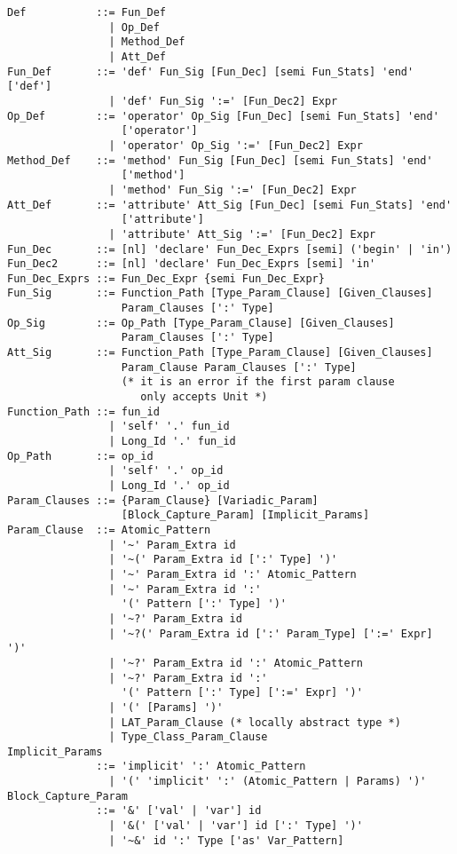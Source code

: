 \begin{lstlisting}
Def           ::= Fun_Def
                | Op_Def
                | Method_Def
                | Att_Def
Fun_Def       ::= 'def' Fun_Sig [Fun_Dec] [semi Fun_Stats] 'end' ['def']
                | 'def' Fun_Sig ':=' [Fun_Dec2] Expr
Op_Def        ::= 'operator' Op_Sig [Fun_Dec] [semi Fun_Stats] 'end' 
                  ['operator']
                | 'operator' Op_Sig ':=' [Fun_Dec2] Expr
Method_Def    ::= 'method' Fun_Sig [Fun_Dec] [semi Fun_Stats] 'end' 
                  ['method']
                | 'method' Fun_Sig ':=' [Fun_Dec2] Expr
Att_Def       ::= 'attribute' Att_Sig [Fun_Dec] [semi Fun_Stats] 'end' 
                  ['attribute']
                | 'attribute' Att_Sig ':=' [Fun_Dec2] Expr
Fun_Dec       ::= [nl] 'declare' Fun_Dec_Exprs [semi] ('begin' | 'in')
Fun_Dec2      ::= [nl] 'declare' Fun_Dec_Exprs [semi] 'in'
Fun_Dec_Exprs ::= Fun_Dec_Expr {semi Fun_Dec_Expr}
Fun_Sig       ::= Function_Path [Type_Param_Clause] [Given_Clauses]
                  Param_Clauses [':' Type]
Op_Sig        ::= Op_Path [Type_Param_Clause] [Given_Clauses]
                  Param_Clauses [':' Type]
Att_Sig       ::= Function_Path [Type_Param_Clause] [Given_Clauses]
                  Param_Clause Param_Clauses [':' Type]
                  (* it is an error if the first param clause
                     only accepts Unit *)
Function_Path ::= fun_id
                | 'self' '.' fun_id
                | Long_Id '.' fun_id
Op_Path       ::= op_id
                | 'self' '.' op_id
                | Long_Id '.' op_id
Param_Clauses ::= {Param_Clause} [Variadic_Param]
                  [Block_Capture_Param] [Implicit_Params]
Param_Clause  ::= Atomic_Pattern
                | '~' Param_Extra id
                | '~(' Param_Extra id [':' Type] ')'
                | '~' Param_Extra id ':' Atomic_Pattern
                | '~' Param_Extra id ':' 
                  '(' Pattern [':' Type] ')'
                | '~?' Param_Extra id
                | '~?(' Param_Extra id [':' Param_Type] [':=' Expr] ')'
                | '~?' Param_Extra id ':' Atomic_Pattern
                | '~?' Param_Extra id ':' 
                  '(' Pattern [':' Type] [':=' Expr] ')'
                | '(' [Params] ')'
                | LAT_Param_Clause (* locally abstract type *)
                | Type_Class_Param_Clause
Implicit_Params 
              ::= 'implicit' ':' Atomic_Pattern
                | '(' 'implicit' ':' (Atomic_Pattern | Params) ')'
Block_Capture_Param
              ::= '&' ['val' | 'var'] id
                | '&(' ['val' | 'var'] id [':' Type] ')'
                | '~&' id ':' Type ['as' Var_Pattern]

\end{lstlisting}

